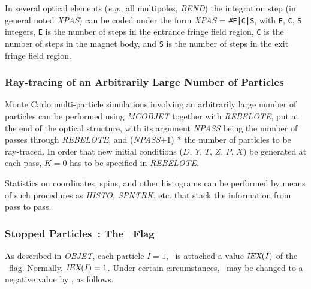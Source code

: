 In several optical elements (\emph{e.g.}, all multipoles, \textsl{BEND}) the 
integration step (in general noted \textsl{XPAS}) can be coded under the 
form \textsl{XPAS} = \texttt{\#E|C|S}, with \texttt{E}, \texttt{C}, \texttt{S} integers, \texttt{E} is the number of
steps  in the entrance fringe field region, \texttt{C} is the number of
steps in the magnet body, and \texttt{S} is the number of steps in the 
exit fringe field region.

\subsubsection{Ray-tracing of an Arbitrarily Large Number of Particles} %
      \label{sec4.6.4}

Monte Carlo multi-particle  simulations involving an 
arbitrarily large number of particles
can be performed using  \textsl{MCOBJET} together with \textsl{REBELOTE}, put at the end of the optical
structure, with its argument \textsl{NPASS} being the number of passes through 
\textsl{REBELOTE}, and (\textsl{NPASS}$+ 1$) * \IMAX{}  
the number of particles to 
be ray-traced. In order that new initial conditions  ($D$, $Y$, $T$, $Z$, 
$P$, $X$) 
 be generated at each pass, $ K=0 $ has to be specified in \textsl{REBELOTE}.
 
\noindent Statistics on coordinates, spins, and other histograms can be
performed by means of such procedures as \textsl{HISTO, SPNTRK}, 
etc. that stack the information from pass to pass. 


\subsubsection{Stopped Particles~: The \IEX\ Flag} 
\label{sec4.6.6}

As described in \textsl{OBJET}, each particle $I=1$, \IMAX\
 is attached a
value $\textsl{IEX}(I)$ of the \IEX\ flag. Normally, $\textsl{IEX}(I)=1$. Under certain 
circumstances, \IEX\ may be changed to a negative value by \zgoubi, as follows. 

